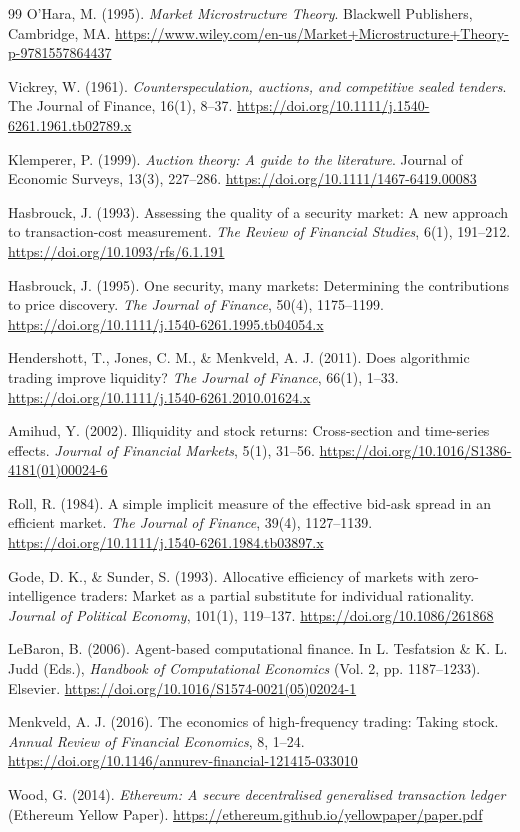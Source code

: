 \documentclass[11pt]{article}
\begin{document}
\begin{thebibliography}{99}
O'Hara, M. (1995).
\textit{Market Microstructure Theory}.
Blackwell Publishers, Cambridge, MA.
\url{https://www.wiley.com/en-us/Market+Microstructure+Theory-p-9781557864437}

Vickrey, W. (1961).
\textit{Counterspeculation, auctions, and competitive sealed tenders}.
The Journal of Finance, 16(1), 8--37.
\url{https://doi.org/10.1111/j.1540-6261.1961.tb02789.x}

Klemperer, P. (1999).
\textit{Auction theory: A guide to the literature}.
Journal of Economic Surveys, 13(3), 227--286.
\url{https://doi.org/10.1111/1467-6419.00083}

Hasbrouck, J. (1993).
Assessing the quality of a security market: A new approach to transaction-cost measurement.
\textit{The Review of Financial Studies}, 6(1), 191--212.
\url{https://doi.org/10.1093/rfs/6.1.191}

Hasbrouck, J. (1995).
One security, many markets: Determining the contributions to price discovery.
\textit{The Journal of Finance}, 50(4), 1175--1199.
\url{https://doi.org/10.1111/j.1540-6261.1995.tb04054.x}

Hendershott, T., Jones, C. M., \& Menkveld, A. J. (2011).
Does algorithmic trading improve liquidity?
\textit{The Journal of Finance}, 66(1), 1--33.
\url{https://doi.org/10.1111/j.1540-6261.2010.01624.x}

Amihud, Y. (2002).
Illiquidity and stock returns: Cross-section and time-series effects.
\textit{Journal of Financial Markets}, 5(1), 31--56.
\url{https://doi.org/10.1016/S1386-4181(01)00024-6}

Roll, R. (1984).
A simple implicit measure of the effective bid-ask spread in an efficient market.
\textit{The Journal of Finance}, 39(4), 1127--1139.
\url{https://doi.org/10.1111/j.1540-6261.1984.tb03897.x}

Gode, D. K., \& Sunder, S. (1993).
Allocative efficiency of markets with zero-intelligence traders: Market as a partial substitute for individual rationality.
\textit{Journal of Political Economy}, 101(1), 119--137.
\url{https://doi.org/10.1086/261868}

LeBaron, B. (2006).
Agent-based computational finance.
In L. Tesfatsion \& K. L. Judd (Eds.), \textit{Handbook of Computational Economics} (Vol. 2, pp. 1187--1233). Elsevier.
\url{https://doi.org/10.1016/S1574-0021(05)02024-1}

Menkveld, A. J. (2016).
The economics of high-frequency trading: Taking stock.
\textit{Annual Review of Financial Economics}, 8, 1--24.
\url{https://doi.org/10.1146/annurev-financial-121415-033010}

Wood, G. (2014).
\textit{Ethereum: A secure decentralised generalised transaction ledger} (Ethereum Yellow Paper).
\url{https://ethereum.github.io/yellowpaper/paper.pdf}

\end{thebibliography}
\end{document}
